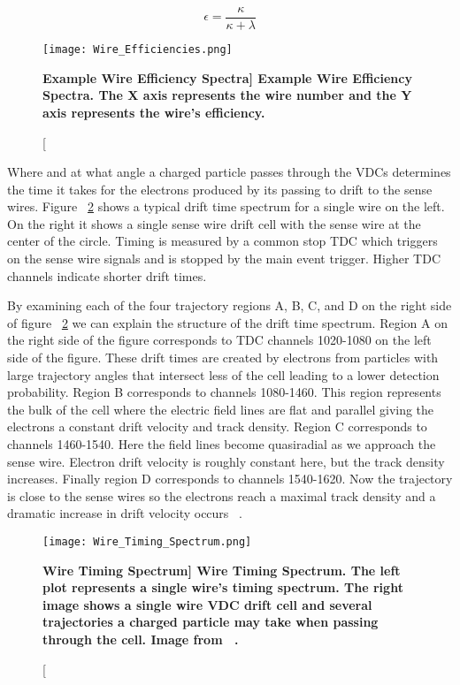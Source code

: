 \begin{equation} \label{eq:wire_efficiency}
	\epsilon = \frac{\kappa}{\kappa + \lambda}
\end{equation}

\begin{figure}[!ht]
\begin{center}
\texttt{[image: Wire\_Efficiencies.png]}
\end{center}
\caption[\bf{Example Wire Efficiency Spectra}]{
{\bf{Example Wire Efficiency Spectra.}} The X axis represents the wire number and the Y axis represents the wire's efficiency.}
\label{fig:vdc_efficiency}
\end{figure}

Where and at what angle a charged particle passes through the VDCs determines the time it takes for the electrons produced by its passing to drift to the sense wires. Figure ~\ref{fig:drift} shows a typical drift time spectrum for a single wire on the left. On the right it shows a single sense wire drift cell with the sense wire at the center of the circle. Timing is measured by a common stop TDC which triggers on the sense wire signals and is stopped by the main event trigger. Higher TDC channels indicate shorter drift times.

By examining each of the four trajectory regions A, B, C, and D on the right side of figure ~\ref{fig:drift} we can explain the structure of the drift time spectrum. Region A on the right side of the figure corresponds to TDC channels 1020-1080 on the left side of the figure. These drift times are created by electrons from particles with large trajectory angles that intersect less of the cell leading to a lower detection probability. Region B corresponds to channels 1080-1460. This region represents the bulk of the cell where the electric field lines are flat and parallel giving the electrons a constant drift velocity and track density. Region C corresponds to channels 1460-1540. Here the field lines become quasiradial as we approach the sense wire. Electron drift velocity is roughly constant here, but the track density increases. Finally region D corresponds to channels 1540-1620. Now the trajectory is close to the sense wires so the electrons reach a maximal track density and a dramatic increase in drift velocity occurs ~\cite{Article:VDCs}.

\begin{figure}[!ht]
\begin{center}
\texttt{[image: Wire\_Timing\_Spectrum.png]}
\end{center}
\caption[\bf{Wire Timing Spectrum}]{
{\bf{Wire Timing Spectrum.}} The left plot represents a single wire's timing spectrum. The right image shows a single wire VDC drift cell and several trajectories a charged particle may take when passing through the cell. Image from ~\cite{Article:VDCs}.}
\label{fig:drift}
\end{figure}

